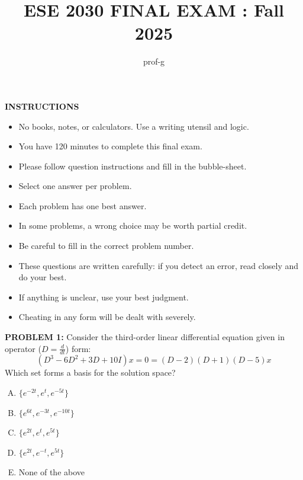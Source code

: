 \documentclass[12pt]{amsart}
\title{ESE 2030 FINAL EXAM : Fall 2025}
\author{prof-g}
\begin{document}
\maketitle

\begin{center}
    {\bf INSTRUCTIONS}
\end{center}

\begin{itemize}
\item 
No books, notes, or calculators. Use a writing utensil and logic. 

\item 
You have 120 minutes to complete this final exam. 

\item 
Please follow question instructions and fill in the bubble-sheet. 

\item 
Select one answer per problem.

\item 
Each problem has one best answer. 

\item 
In some problems, a wrong choice may be worth partial credit. 

\item 
Be careful to fill in the correct problem number. 

\item 
These questions are written carefully: if you detect an error, read closely and do your best.

\item 
If anything is unclear, use your best judgment. 

\item 
Cheating in any form will be dealt with severely. 
\end{itemize}

\newpage





{\bf PROBLEM 1:}
% 
Consider the third-order linear differential equation given in operator ($D = \frac{d}{dt}$) form:
$$(D^3 - 6D^2 + 3D + 10I)x = 0 = (D-2)(D+1)(D-5)x $$
Which set forms a basis for the solution space?

\begin{enumerate}[(A)]
\item $\{e^{-2t}, e^{t}, e^{-5t}\}$
\item $\{e^{6t}, e^{-3t}, e^{-10t}\}$
\item $\{e^{2t}, e^{t}, e^{5t}\}$
\item $\{e^{2t}, e^{-t}, e^{5t}\}$
\item None of the above
\end{enumerate}
\end{document}

